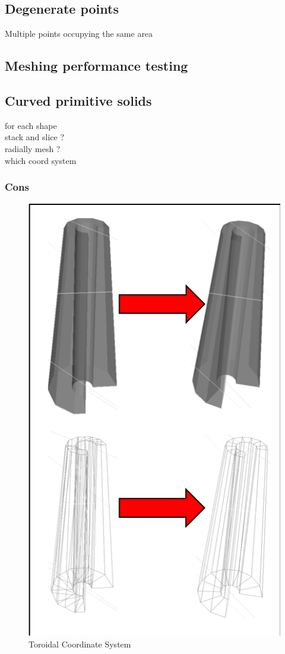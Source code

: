 \documentclass[12pt,a4paper]{article}
\begin{document}
\subsection{Degenerate points}
Multiple points occupying the same area

\subsection{Meshing performance testing}

\subsection{Curved primitive solids}
for each shape\\
stack and slice ?\\
radially mesh ?\\
which coord system

\newpage
\subsubsection{Cons}

\begin{figure}[h!]
\centering
\includegraphics[scale=0.5]{Images//Meshes//cons.png}
\caption[width=\columnwidth]{Toroidal Coordinate System}
\label{cons}
\end{figure}
\end{document}
